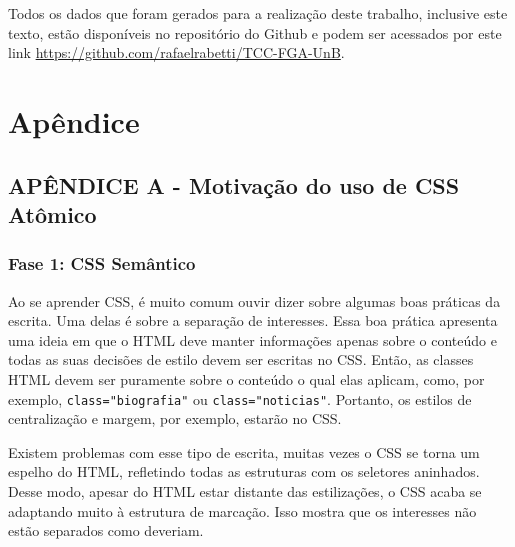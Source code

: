 Todos os dados que foram gerados para a realização deste trabalho, inclusive este texto, estão disponíveis no repositório do Github e podem ser acessados por este link \href{https://github.com/rafaelrabetti/TCC-FGA-UnB}{https://github.com/rafaelrabetti/TCC-FGA-UnB}.

 

\hypertarget{apuxeandice}{%
\chapter{Apêndice}\label{apuxeandice}}

\hypertarget{apuxeandice-a---motivauxe7uxe3o-do-uso-de-css-atuxf4mico}{%
\section{APÊNDICE A - Motivação do uso de CSS
Atômico}\label{apuxeandice-a---motivauxe7uxe3o-do-uso-de-css-atuxf4mico}}

\hypertarget{fase-1-css-semuxe2ntico}{%
\subsection{Fase 1: CSS Semântico}\label{fase-1-css-semuxe2ntico}}

Ao se aprender CSS, é muito comum ouvir dizer sobre algumas boas
práticas da escrita. Uma delas é sobre a separação de interesses. Essa
boa prática apresenta uma ideia em que o HTML deve manter informações
apenas sobre o conteúdo e todas as suas decisões de estilo devem ser
escritas no CSS. Então, as classes HTML devem ser puramente sobre o
conteúdo o qual elas aplicam, como, por exemplo,
\texttt{class="biografia"} ou \texttt{class="noticias"}. Portanto, os
estilos de centralização e margem, por exemplo, estarão no CSS.

\begin{Shaded}
\begin{Highlighting}[]
\KeywordTok{>} 
    \KeywordTok{>} 
\end{Highlighting}
\end{Shaded}

Existem problemas com esse tipo de escrita, muitas vezes o CSS se torna
um espelho do HTML, refletindo todas as estruturas com os seletores
aninhados. Desse modo, apesar do HTML estar distante das estilizações, o
CSS acaba se adaptando muito à estrutura de marcação. Isso mostra que os
interesses não estão separados como deveriam.

